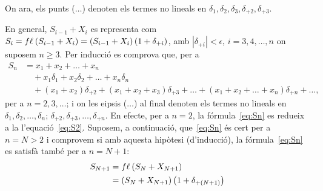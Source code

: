 \documentclass[a4paper,twoside,12pt]{exam}
\begin{document}
\begin{questions}
\begin{solution}
\begin{enumerate}[label=(\roman*), ref=(\roman*)]
		On ara, els punts ($\ldots$) denoten els termes no lineals en
		$\delta_{1}, \delta_{2}, \delta_{3}, \delta_{+2}, \delta_{+3}$.
\end{enumerate}
En general, $S_{i-1}+X_{i}$ es representa com $S_{i} = 
	f\ell_{\mathrm{}}\left(S_{i-1}+X_{i}\right) =\left(S_{i-1}+X_{i}\right)\left(1+
	\delta_{+i}\right)$, amb $|\delta_{+i}|<\epsilon$, 
	$i=3,4,\dots,n$ on suposem $n\ge 3$. Per inducció es comprova que, per a
	\begin{align}
		S_{n} &= x_{1} + x_{2} + \dots + x_{n}\nonumber\\
		      &\quad+ x_{1}\delta_{1} + x_{2}\delta_{2} + \dots 
		       + x_{n}\delta_{n}\nonumber\\
		      &\quad+ \left(x_{1} + x_{2}\right)\delta_{+2} 
	               + \left(x_{1} + x_{2} + x_{3}\right)\delta_{+3} 
		       + \dots 
		       +\left(x_{1} + x_{2} + \dots + x_{n}\right)\delta_{+n} 
		       +\dots,\label{eq:Sn}
	\end{align}
	per a $n=2,3,\dots$; i on les e\lgem ipsis ($\ldots$) al final denoten
	els termes no lineals en $\delta_{1}, \delta_{2},\dots,\delta_{n}$;
	$\delta_{+2},\delta_{+3},\dots,\delta_{+n}$. En efecte, per a $n=2$, la
	fórmula~\eqref{eq:Sn} es redueix a la l'equació~\eqref{eq:S2}. Suposem,
	a continuació, que~\eqref{eq:Sn} és cert per a $n = N > 2$ i comprovem
	si amb aquesta hipòtesi (d'inducció), la fórmula~\eqref{eq:Sn} es
	satisfà també per a $n = N+1$:
	\begin{align*}
		S_{N+1} &= \fl{}{S_{N} + X_{N+1}} \\
			&= \left(S_{N} 
		           + X_{N+1}\right)\left(1 + \delta_{+(N+1)}\right)\\

\end{align*}
\end{solution}
\end{questions}
\end{document}
